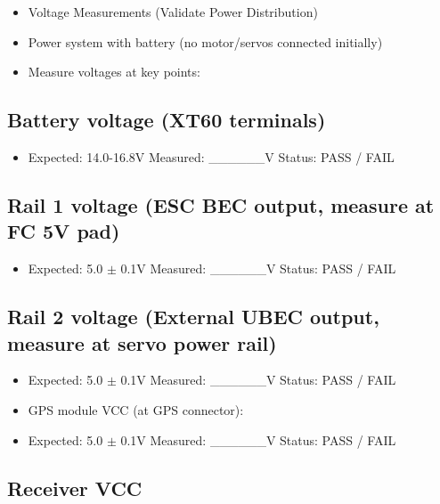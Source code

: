 \documentclass[11pt,letterpaper]{article}
\begin{document}
\begin{itemize}
  \item Voltage Measurements (Validate Power Distribution)
  \item Power system with battery (no motor/servos connected initially)
  \item Measure voltages at key points:
\end{itemize}

\subsection{Battery voltage (XT60 terminals)}

\begin{itemize}
  \item Expected: 14.0-16.8V    Measured: \_\_\_\_\_\_V    Status: PASS / FAIL
\end{itemize}

\subsection{Rail 1 voltage (ESC BEC output, measure at FC 5V pad)}

\begin{itemize}
  \item Expected: 5.0 $\pm$ 0.1V    Measured: \_\_\_\_\_\_V    Status: PASS / FAIL
\end{itemize}

\subsection{Rail 2 voltage (External UBEC output, measure at servo power rail)}

\begin{itemize}
  \item Expected: 5.0 $\pm$ 0.1V    Measured: \_\_\_\_\_\_V    Status: PASS / FAIL
\end{itemize}

\begin{itemize}
  \item GPS module VCC (at GPS connector):
  \item Expected: 5.0 $\pm$ 0.1V    Measured: \_\_\_\_\_\_V    Status: PASS / FAIL
\end{itemize}

\subsection{Receiver VCC}
\end{document}
